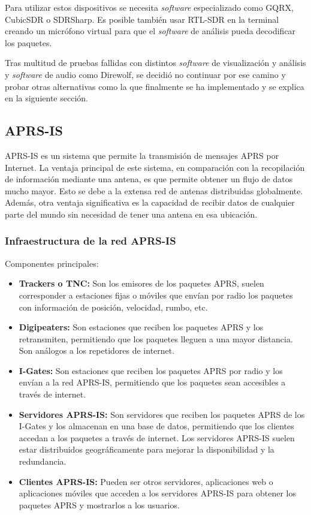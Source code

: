 Para utilizar estos dispositivos se necesita \textit{software} especializado como GQRX, CubicSDR o SDRSharp. Es posible también usar RTL-SDR en la terminal creando un micrófono virtual para que el \textit{software} de análisis pueda decodificar los paquetes.

Tras multitud de pruebas fallidas con distintos \textit{software} de visualización y análisis y \textit{software} de audio como Direwolf, se decidió no continuar por ese camino y probar otras alternativas como la que finalmente se ha implementado y se explica en la siguiente sección.

\subsection{APRS-IS}
APRS-IS es un sistema que permite la transmisión de mensajes APRS por Internet. La ventaja principal de este sistema, en comparación con la recopilación de información mediante una antena, es que permite obtener un flujo de datos mucho mayor. Esto se debe a la extensa red de antenas distribuidas globalmente. Además, otra ventaja significativa es la capacidad de recibir datos de cualquier parte del mundo sin necesidad de tener una antena en esa ubicación.

\subsubsection*{Infraestructura de la red APRS-IS}
Componentes principales:
\begin{itemize}
	\item \textbf{Trackers o TNC:} Son los emisores de los paquetes APRS, suelen corresponder a estaciones fijas o móviles que envían por radio los paquetes con información de posición, velocidad, rumbo, etc.
	\item \textbf{Digipeaters:} Son estaciones que reciben los paquetes APRS y los retransmiten, permitiendo que los paquetes lleguen a una mayor distancia. Son análogos a los repetidores de internet.
	\item \textbf{I-Gates:} Son estaciones que reciben los paquetes APRS por radio y los envían a la red APRS-IS, permitiendo que los paquetes sean accesibles a través de internet.
	\item \textbf{Servidores APRS-IS:} Son servidores que reciben los paquetes APRS de los I-Gates y los almacenan en una base de datos, permitiendo que los clientes accedan a los paquetes a través de internet. Los servidores APRS-IS suelen estar distribuidos geográficamente para mejorar la disponibilidad y la redundancia.
	\item \textbf{Clientes APRS-IS:} Pueden ser otros servidores, aplicaciones web o aplicaciones móviles que acceden a los servidores APRS-IS para obtener los paquetes APRS y mostrarlos a los usuarios.
\end{itemize}

